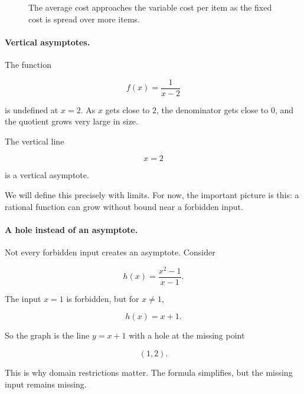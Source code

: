 \begin{figure}[h]
\centering
{}
\caption{The average cost approaches the variable cost per item as the fixed cost is spread over more items.}
\label{fig:average-cost-asymptote}
\end{figure}

\paragraph{Vertical asymptotes.}
The function

\[
f(x)=\frac{1}{x-2}
\]

is undefined at \(x=2\). As \(x\) gets close to \(2\), the denominator gets close to \(0\), and the quotient grows very large in size.

The vertical line

\[
x=2
\]

is a vertical asymptote.

We will define this precisely with limits. For now, the important picture is this: a rational function can grow without bound near a forbidden input.

\paragraph{A hole instead of an asymptote.}
Not every forbidden input creates an asymptote. Consider

\[
h(x)=\frac{x^2-1}{x-1}.
\]

The input \(x=1\) is forbidden, but for \(x\neq1\),

\[
h(x)=x+1.
\]

So the graph is the line \(y=x+1\) with a hole at the missing point

\[
(1,2).
\]

This is why domain restrictions matter. The formula simplifies, but the missing input remains missing.


